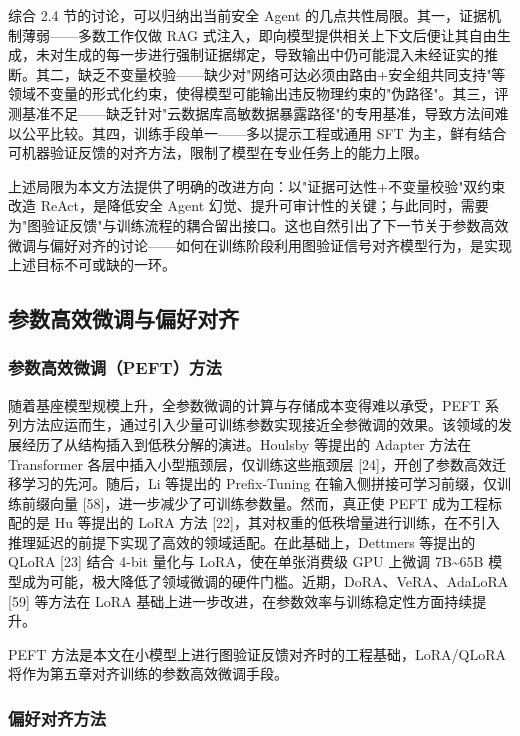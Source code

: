 \documentclass[a4paper,12pt]{ctexart}
\begin{document}
综合 2.4 节的讨论，可以归纳出当前安全 Agent 的几点共性局限。其一，证据机制薄弱——多数工作仅做 RAG 式注入，即向模型提供相关上下文后便让其自由生成，未对生成的每一步进行强制证据绑定，导致输出中仍可能混入未经证实的推断。其二，缺乏不变量校验——缺少对"网络可达必须由路由+安全组共同支持"等领域不变量的形式化约束，使得模型可能输出违反物理约束的"伪路径"。其三，评测基准不足——缺乏针对"云数据库高敏数据暴露路径"的专用基准，导致方法间难以公平比较。其四，训练手段单一——多以提示工程或通用 SFT 为主，鲜有结合可机器验证反馈的对齐方法，限制了模型在专业任务上的能力上限。

上述局限为本文方法提供了明确的改进方向：以"证据可达性+不变量校验"双约束改造 ReAct，是降低安全 Agent 幻觉、提升可审计性的关键；与此同时，需要为"图验证反馈"与训练流程的耦合留出接口。这也自然引出了下一节关于参数高效微调与偏好对齐的讨论——如何在训练阶段利用图验证信号对齐模型行为，是实现上述目标不可或缺的一环。

\subsection{参数高效微调与偏好对齐}

\subsubsection{参数高效微调（PEFT）方法}

随着基座模型规模上升，全参数微调的计算与存储成本变得难以承受，PEFT 系列方法应运而生，通过引入少量可训练参数实现接近全参微调的效果。该领域的发展经历了从结构插入到低秩分解的演进。Houlsby 等提出的 Adapter 方法在 Transformer 各层中插入小型瓶颈层，仅训练这些瓶颈层 [24]，开创了参数高效迁移学习的先河。随后，Li 等提出的 Prefix-Tuning 在输入侧拼接可学习前缀，仅训练前缀向量 [58]，进一步减少了可训练参数量。然而，真正使 PEFT 成为工程标配的是 Hu 等提出的 LoRA 方法 [22]，其对权重的低秩增量进行训练，在不引入推理延迟的前提下实现了高效的领域适配。在此基础上，Dettmers 等提出的 QLoRA [23] 结合 4-bit 量化与 LoRA，使在单张消费级 GPU 上微调 7B\textasciitilde{}65B 模型成为可能，极大降低了领域微调的硬件门槛。近期，DoRA、VeRA、AdaLoRA [59] 等方法在 LoRA 基础上进一步改进，在参数效率与训练稳定性方面持续提升。

PEFT 方法是本文在小模型上进行图验证反馈对齐时的工程基础，LoRA/QLoRA 将作为第五章对齐训练的参数高效微调手段。

\subsubsection{偏好对齐方法}
\end{document}

